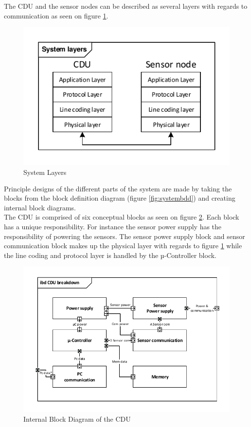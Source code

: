 The CDU and the sensor nodes can be described as several layers with regards to communication as seen on figure \ref{fig:systemlayers}.
\begin{figure}[H]
	\centering
	\includegraphics[width=.6\textwidth]{billeder/11ProjectDescription/System_Layers}
	\caption{System Layers}
	\label{fig:systemlayers}
\end{figure}

Principle designs of the different parts of the system are made by taking the blocks from the block definition diagram (figure \ref{fig:systembdd}) and creating internal block diagrams.\\
The CDU is comprised of six conceptual blocks as seen on figure \ref{CDU_IBD}. Each block has a unique responsibility. For instance the sensor power supply has the responsibility of powering the sensors. The sensor power supply block and sensor communication block makes up the physical layer with regards to figure \ref{fig:systemlayers} while the line coding and protocol layer is handled by the µ-Controller block. 

\begin{figure}[hbpt]
\centering
\includegraphics[width=.8\textwidth]{billeder/11ProjectDescription/CDU_IBD}
\caption{Internal Block Diagram of the CDU}
\label{CDU_IBD}
\end{figure}

